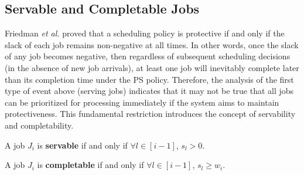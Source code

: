 \subsection{Servable and Completable Jobs}
Friedman \textit{et al.} \cite{friedman2003protective} proved that a scheduling policy is protective if and only if the slack of each job remains non-negative at all times. In other words, once the slack of any job becomes negative, then regardless of subsequent scheduling decisions (in the absence of new job arrivals), at least one job will inevitably complete later than its completion time under the PS policy. Therefore, the analysis of the first type of event above (serving jobs) indicates that it may not be true that all jobs can be prioritized for processing immediately if the system aims to maintain protectiveness. This fundamental restriction introduces the concept of servability and completability. %


\begin{definition}
    A job $J_i$ is \textbf{servable} if and only if $\forall l \in [i-1]$, $s_{l} > 0$.
\end{definition}

\begin{definition}
    A job $J_i$ is \textbf{completable} if and only if $\forall l \in [i-1]$, $s_{l} \ge w_{i}$.
\end{definition}


